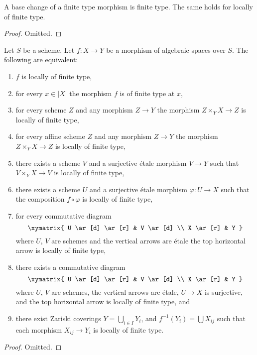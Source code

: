 \begin{lemma}
\label{lemma-base-change-finite-type}
A base change of a finite type morphism is finite type.
The same holds for locally of finite type.
\end{lemma}

\begin{proof}
Omitted.
\end{proof}

\begin{lemma}
\label{lemma-finite-type-local}
Let $S$ be a scheme.
Let $f : X \to Y$ be a morphism of algebraic spaces over $S$.
The following are equivalent:
\begin{enumerate}
\item $f$ is locally of finite type,
\item for every $x \in |X|$ the morphism $f$ is of finite type at $x$,
\item for every scheme $Z$ and any morphism $Z \to Y$ the morphism
$Z \times_Y X \to Z$ is locally of finite type,
\item for every affine scheme $Z$ and any morphism
$Z \to Y$ the morphism $Z \times_Y X \to Z$ is locally of finite type,
\item there exists a scheme $V$ and a surjective \'etale morphism
$V \to Y$ such that $V \times_Y X \to V$ is locally of finite type,
\item there exists a scheme $U$ and a surjective \'etale morphism
$\varphi : U \to X$ such that the composition $f \circ \varphi$
is locally of finite type,
\item for every commutative diagram
$$
\xymatrix{
U \ar[d] \ar[r] & V \ar[d] \\
X \ar[r] & Y
}
$$
where $U$, $V$ are schemes and the vertical arrows are \'etale
the top horizontal arrow is locally of finite type,
\item there exists a commutative diagram
$$
\xymatrix{
U \ar[d] \ar[r] & V \ar[d] \\
X \ar[r] & Y
}
$$
where $U$, $V$ are schemes, the vertical arrows are \'etale, $U \to X$
is surjective, and the top horizontal arrow is locally of finite type, and
\item there exist Zariski coverings $Y = \bigcup_{i \in I} Y_i$,
and $f^{-1}(Y_i) = \bigcup X_{ij}$ such that
each morphism $X_{ij} \to Y_i$ is locally of finite type.
\end{enumerate}
\end{lemma}

\begin{proof}
Omitted.
\end{proof}

